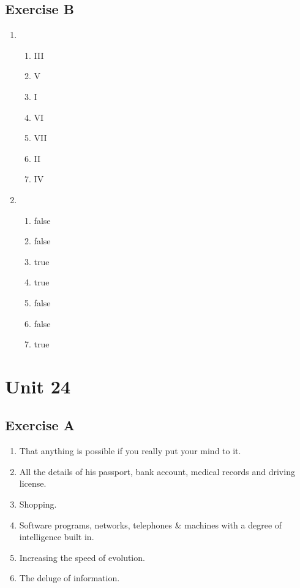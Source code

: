 \documentclass[a5paper,10pt,notitlepage,pdftex,headsepline]{scrartcl}
\begin{document}
  \subsection{Exercise B}
    \begin{enumerate}
      \item \begin{enumerate}
          \item III
          \item V
          \item I
          \item VI
          \item VII
          \item II
          \item IV
        \end{enumerate}
      \item \begin{enumerate}
          \item false
          \item false
          \item true
          \item true
          \item false
          \item false
          \item true
        \end{enumerate}
    \end{enumerate}
\section{Unit 24}
  \subsection{Exercise A}
    \begin{enumerate}
      \item That anything is possible if you really put your mind to it.
      \item All the details of his passport, bank account, medical records and
        driving license.
      \item Shopping.
      \item Software programs, networks, telephones \& machines with a degree
        of intelligence built in.
      \item Increasing the speed of evolution.
      \item The deluge of information.
    \end{enumerate}
\end{document}
